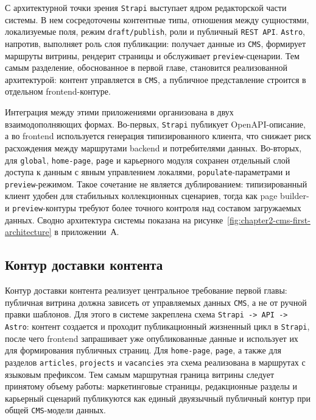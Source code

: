 С архитектурной точки зрения \texttt{Strapi} выступает ядром редакторской части
системы. В нем сосредоточены контентные типы, отношения между сущностями,
локализуемые поля, режим \texttt{draft/publish}, роли и публичный \texttt{REST API}.
\texttt{Astro}, напротив, выполняет роль слоя публикации: получает данные из
\texttt{CMS}, формирует маршруты витрины, рендерит страницы и обслуживает
\texttt{preview}-сценарии. Тем самым разделение, обоснованное в первой главе,
становится реализованной архитектурой: контент управляется в \texttt{CMS}, а публичное
представление строится в отдельном frontend-контуре.

Интеграция между этими приложениями организована в двух взаимодополняющих формах.
Во-первых, \texttt{Strapi} публикует OpenAPI-описание, а во frontend используется
генерация типизированного клиента, что снижает риск расхождения между маршрутами
backend и потребителями данных. Во-вторых, для \texttt{global}, \texttt{home-page},
\texttt{page} и карьерного модуля сохранен отдельный слой доступа к данным с явным
управлением локалями, \texttt{populate}-параметрами и \texttt{preview}-режимом. Такое
сочетание не является дублированием: типизированный клиент удобен для стабильных
коллекционных сценариев, тогда как page builder- и \texttt{preview}-контуры требуют
более точного контроля над составом загружаемых данных. Сводно архитектура системы
показана на рисунке~\ref{fig:chapter2-cms-first-architecture} в приложении~А.

\subsection{Контур доставки контента}

Контур доставки контента реализует центральное требование первой главы: публичная
витрина должна зависеть от управляемых данных \texttt{CMS}, а не от ручной правки
шаблонов. Для этого в системе закреплена схема \texttt{Strapi -> API -> Astro}:
контент создается и проходит публикационный жизненный цикл в \texttt{Strapi}, после
чего frontend запрашивает уже опубликованные данные и использует их для формирования
публичных страниц. Для \texttt{home-page}, \texttt{page}, а также для разделов
\texttt{articles}, \texttt{projects} и \texttt{vacancies} эта схема реализована в
маршрутах с языковым префиксом. Тем самым маршрутная граница витрины следует
принятому объему работы: маркетинговые страницы, редакционные разделы и карьерный
сценарий публикуются как единый двуязычный публичный контур при общей
\texttt{CMS}-модели данных.

